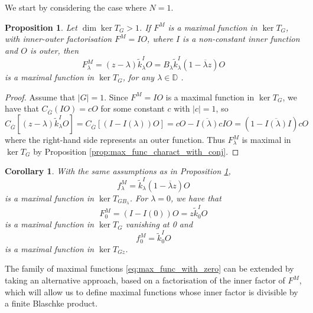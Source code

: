 \documentclass{article}
\numberwithin{equation}{section}
\theoremstyle{plain}
\newtheorem{prop}[thm]{Proposition}
\newtheorem{cor}[thm]{Corollary}
\newcommand{\DD}{\ensuremath{\mathbb{D}}}
\newcommand{\ol}[1]{\ensuremath{\overline{#1}}}
\begin{document}
We start by considering the case where $N=1$.


\begin{prop}
\label{prop:max_func_vanishing}
Let $\dim \ker T_G >1$.
If $F^M$ is a maximal function in $\ker T_G$, with inner-outer factorisation $F^M = IO$, where $I$ is a non-constant inner function and $O$ is outer, then
\begin{equation}
\label{eq:max_func_with_zero}
F^M_\lambda = (z-\lambda) \tilde k^I_\lambda O = B_\lambda \tilde k^I_\lambda (1-\ol\lambda z) O
\end{equation}
is a maximal function in $\ker T_G$, for any $\lambda\in\DD$ .
\end{prop}


\begin{proof}
Assume that $|G|=1$.
Since $F^M = IO$ is a maximal function in $\ker T_G$, we have that $C_{\ol G} (IO) = cO$ for some constant $c$ with $|c|=1$, so
\begin{equation}
C_{\ol G} [ (z-\lambda) \tilde k^I_\lambda O ] = C_{\ol G} [ (I - I(\lambda)) O ] = cO - \ol{I(\lambda)} c I O = (1 - \ol{I(\lambda)} I) cO
\end{equation}
where the right-hand side represents an outer function.
Thus $F^M_\lambda$ is maximal in $\ker T_G$ by Proposition \ref{prop:max_func_charact_with_conj}.
\end{proof}


\begin{cor}
With the same assumptions as in Proposition \ref{prop:max_func_vanishing},  
\begin{equation}
f^M_\lambda = \tilde k^I_\lambda (1-\ol\lambda z) O
\end{equation}
is a maximal function in $\ker T_{G B_\lambda}$.
For $\lambda = 0$, we have that
\begin{equation}
F^M_0 = (I - I(0)) O = z \tilde k_0^I O
\end{equation}
is a maximal function in $\ker T_G$ vanishing at 0 and
\begin{equation}
f^M_0 = \tilde k_0^I O
\end{equation}
is a maximal function in $\ker T_{Gz}$.
\end{cor}


The family of maximal functions \eqref{eq:max_func_with_zero} can be extended by taking an alternative approach, based on a factorisation of the inner factor of $F^M$, which will allow us to define maximal functions whose inner factor is divisible by a finite Blaschke product.
\end{document}
